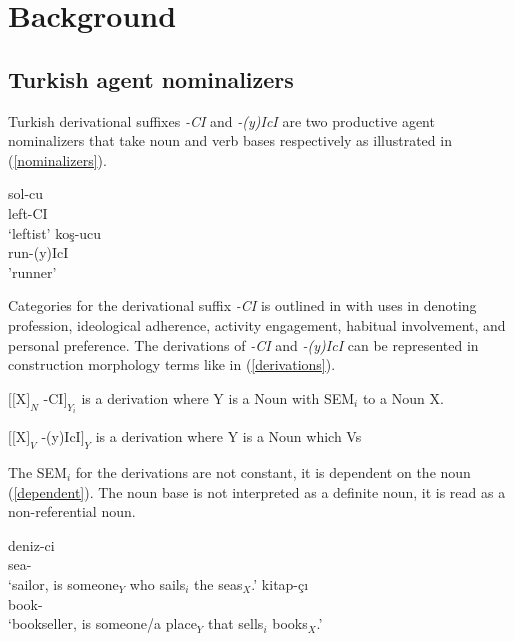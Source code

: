 \section{Background}
    \subsection{Turkish agent nominalizers}
    Turkish derivational suffixes \textit{-CI} and \textit{-(y)IcI} are two productive agent nominalizers that take noun and verb bases respectively as illustrated in (\ref{nominalizers}).
    
    \begin{exe}
    \ex \label{nominalizers}
    \begin{multicols}{2}
    \begin{xlist}
        \ex \gll sol-cu \\ left-CI \\
        \glt `leftist'
       \columnbreak
        \ex \gll koş-ucu \\ run-(y)IcI \\
        \glt 'runner'
    \end{xlist}
    \end{multicols}
    \end{exe}
 Categories for the derivational suffix \textit{-CI} is outlined in \cite{goksel2004turkish} with uses in denoting profession, ideological adherence, activity engagement, habitual involvement, and personal preference. The derivations of \textit{-CI} and \textit{-(y)IcI} can be represented in construction morphology terms \citep{booij2005compounding} like in (\ref{derivations}).
 
 \begin{exe}
    \ex \label{derivations}
    \begin{xlist}
        \ex $[[$X$]_{N}$ -CI$]_{Y_{i}}$ is a derivation where Y is a Noun with SEM$_{i}$ to a Noun X.
        
        \ex $[[$X$]_{V}$ -(y)IcI$]_{Y}$ is a derivation where Y is a Noun which Vs
    \end{xlist}
 \end{exe}
The SEM$_{i}$ for the derivations are not constant, it is dependent on the noun (\ref{dependent}). The noun base is not interpreted as a definite noun, it is read as a non-referential noun.

\begin{exe}
    \ex \label{dependent}
    \begin{xlist}
    \ex \gll deniz-ci \\ sea-{\Ci} \\ \glt `sailor, is someone$_{Y}$ who sails$_{i}$ the seas$_{X}$.'
    \ex \gll kitap-çı \\ book-{\Ci} \\ \glt `bookseller, is someone/a place$_{Y}$ that sells$_{i}$ books$_{X}$.'
    \end{xlist}
\end{exe}
    
